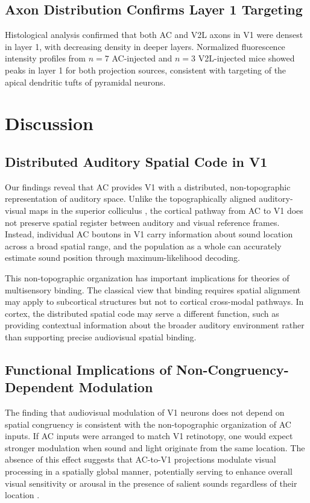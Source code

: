 \documentclass[11pt]{article}
\begin{document}
\subsection{Axon Distribution Confirms Layer 1 Targeting}

Histological analysis confirmed that both AC and V2L axons in V1 were densest in layer 1, with decreasing density in deeper layers. Normalized fluorescence intensity profiles from $n = 7$ AC-injected and $n = 3$ V2L-injected mice showed peaks in layer 1 for both projection sources, consistent with targeting of the apical dendritic tufts of pyramidal neurons.

\section{Discussion}

\subsection{Distributed Auditory Spatial Code in V1}

Our findings reveal that AC provides V1 with a distributed, non-topographic representation of auditory space. Unlike the topographically aligned auditory-visual maps in the superior colliculus \citep{king2004superior}, the cortical pathway from AC to V1 does not preserve spatial register between auditory and visual reference frames. Instead, individual AC boutons in V1 carry information about sound location across a broad spatial range, and the population as a whole can accurately estimate sound position through maximum-likelihood decoding.

This non-topographic organization has important implications for theories of multisensory binding. The classical view that binding requires spatial alignment \citep{stein2012new} may apply to subcortical structures but not to cortical cross-modal pathways. In cortex, the distributed spatial code may serve a different function, such as providing contextual information about the broader auditory environment rather than supporting precise audiovisual spatial binding.

\subsection{Functional Implications of Non-Congruency-Dependent Modulation}

The finding that audiovisual modulation of V1 neurons does not depend on spatial congruency is consistent with the non-topographic organization of AC inputs. If AC inputs were arranged to match V1 retinotopy, one would expect stronger modulation when sound and light originate from the same location. The absence of this effect suggests that AC-to-V1 projections modulate visual processing in a spatially global manner, potentially serving to enhance overall visual sensitivity or arousal in the presence of salient sounds regardless of their location \citep{kayser2007functional}.
\end{document}
